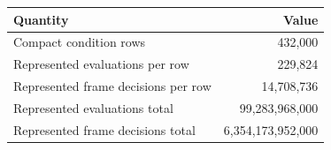 \begin{tabular}{lr}
\toprule
Quantity & Value \\
\midrule
Compact condition rows & 432,000 \\
Represented evaluations per row & 229,824 \\
Represented frame decisions per row & 14,708,736 \\
Represented evaluations total & 99,283,968,000 \\
Represented frame decisions total & 6,354,173,952,000 \\
\bottomrule
\end{tabular}
